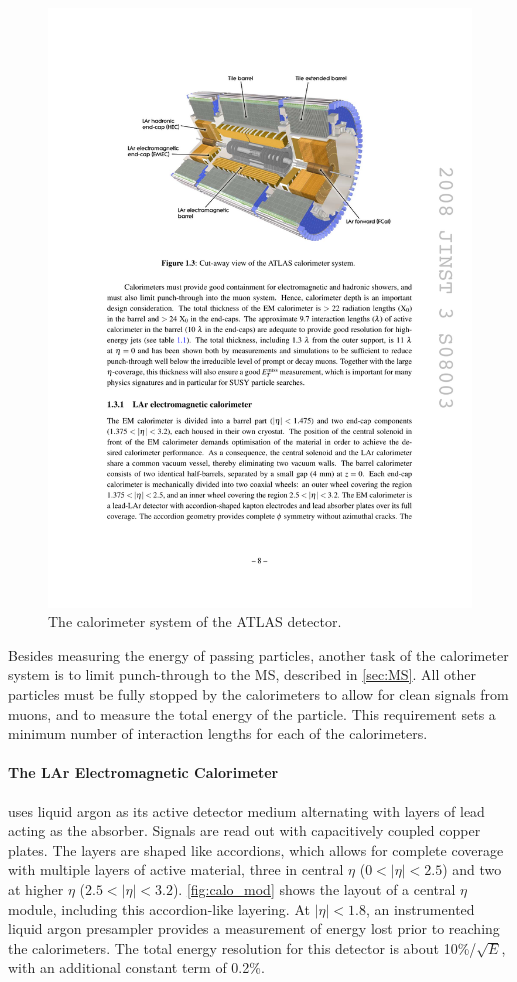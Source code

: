 \begin{centering}
\begin{figure}[bth]
\myfloatalign
\includegraphics[width=.90\linewidth]{figures/atlas/calorimeters.pdf}
\caption{The calorimeter system of the \ac{ATLAS} detector.}
\label{fig:calo}
\end{figure}
\end{centering}

Besides measuring the energy of passing particles, another task of the calorimeter system is to limit punch-through to the \ac{MS}, described in \autoref{sec:MS}. All other particles must be fully stopped by the calorimeters to allow for clean signals from muons, and to measure the total energy of the particle. This requirement sets a minimum number of interaction lengths for each of the calorimeters. 

\paragraph{The LAr Electromagnetic Calorimeter} uses liquid argon as its active detector medium alternating with layers of lead acting as the absorber. Signals are read out with capacitively coupled copper plates. The layers are shaped like accordions, which allows for complete coverage with multiple layers of active material, three in central $\eta$ ($0<|\eta|<2.5$) and two at higher $\eta$ ($2.5 < |\eta| < 3.2$). \autoref{fig:calo_mod} shows the layout of a central $\eta$ module, including this accordion-like layering. At $|\eta| < 1.8$, an instrumented liquid argon presampler provides a measurement of energy lost prior to reaching the calorimeters. The total energy resolution for this detector is about 10\%/$\sqrt{E}$, with an additional constant term of 0.2\%. 

